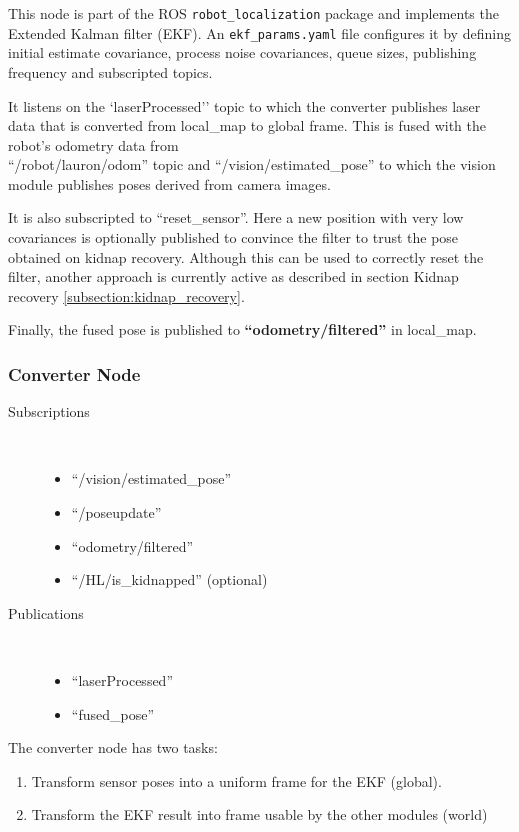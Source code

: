 This node is part of the ROS \texttt{robot\_localization} package and implements the Extended Kalman filter (EKF). An \texttt{ekf\_params.yaml} file configures it by defining initial estimate covariance, process noise covariances, queue sizes, publishing frequency and subscripted topics.

It listens on the `laserProcessed'' topic to which the converter publishes laser data that is converted from local\_map to global frame. This is fused with the robot's odometry data from \\ ``/robot/lauron/odom'' topic and ``/vision/estimated\_pose'' to which the vision module publishes poses derived from camera images.

It is also subscripted to ``reset\_sensor''. Here a new position with very low covariances is optionally published to convince the filter to trust the pose obtained on kidnap recovery. Although this can be used to correctly reset the filter, another approach is currently active as described in section Kidnap recovery \ref{subsection:kidnap_recovery}.

Finally, the fused pose is published to \textbf{``odometry/filtered''} in local\_map.

\subsubsection{Converter Node}
\begin{description}
\item[Subscriptions]\
	\begin{itemize}
	\item ``/vision/estimated\_pose'' 
	\item ``/poseupdate'' 
	\item ``odometry/filtered'' 
	\item ``/HL/is\_kidnapped'' (optional)
	\end{itemize}
	
\item[Publications]\
	\begin{itemize}
	\item ``laserProcessed''
	\item ``fused\_pose''
	\end{itemize}
\end{description}

The converter node has two tasks:

\begin{enumerate}
\item Transform sensor poses into a uniform frame for the EKF (global).
\item Transform the EKF result into frame usable by the other modules (world)
\end{enumerate}

